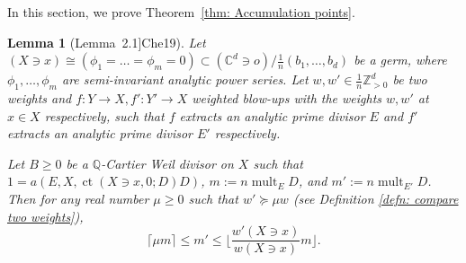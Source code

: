 \documentclass[11pt]{amsart}
\numberwithin{equation}{section}
\newcommand{\Qq}{\mathbb{Q}}
\newcommand{\Rr}{\mathbb{R}}
\newcommand{\ct}{\operatorname{ct}}
\newcommand{\mult}{\operatorname{mult}}
\newtheorem{lem}[thm]{Lemma}
\theoremstyle{definition}
\theoremstyle{definition}
\begin{document}
In this section, we prove Theorem~\ref{thm: Accumulation points}. %



\begin{lem}[{Lemma~2.1]{Che19}}]\label{lem: weighted blow up comparison inequality}
Let $(X\ni x)\cong(\phi_1=\dots=\phi_m=0)\subset(\mathbb C^d\ni o)/\frac{1}{n}(b_1,\dots,b_d)$ be a germ, where $\phi_1,\dots,\phi_m$ are semi-invariant analytic power series. Let $w,w'\in\frac{1}{n}\mathbb Z^d_{>0}$ be two weights and $f: Y\rightarrow X, f': Y'\rightarrow X$ weighted blow-ups with the weights $w,w'$ at $x\in X$ respectively, such that $f$ extracts an analytic prime divisor $E$ and $f'$ extracts an analytic prime divisor $E'$ respectively.

Let $B\geq 0$ be a $\Qq$-Cartier Weil divisor on $X$ such that $1=a(E,X,\ct(X\ni x,0;D)D)$, $m:=n\mult_ED$, and $m':=n\mult_{E'}D$. Then for any real number $\mu\geq 0$ such that $w'\succeq\mu w$ (see Definition \ref{defn: compare two weights}),
$$\lceil\mu m\rceil \leq m'\leq\lfloor \frac{w'(X\ni x)}{w(X\ni x)}m\rfloor.$$
\end{lem}
\end{document}
